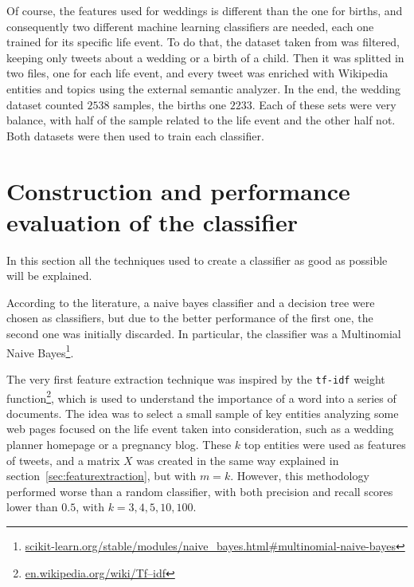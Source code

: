 Of course, the features used for weddings is different than the one for births, and consequently two different machine learning classifiers are needed, each one trained for its specific life event. To do that, the dataset taken from \cite{dickinson2015identifying} was filtered, keeping only tweets about a wedding or a birth of a child. Then it was splitted in two files, one for each life event, and every tweet was enriched with Wikipedia entities and topics using the external semantic analyzer. In the end, the wedding dataset counted $2538$ samples, the births one $2233$. Each of these sets were very balance, with half of the sample related to the life event and the other half not. Both datasets were then used to train each classifier.

\section{Construction and performance evaluation of the classifier}
In this section all the techniques used to create a classifier as good as possible will be explained.

 According to the literature, a naive bayes classifier and a decision tree were chosen as classifiers, but due to the better performance of the first one, the second one was initially discarded. In particular, the classifier was a Multinomial Naive Bayes\footnote{\url{scikit-learn.org/stable/modules/naive_bayes.html#multinomial-naive-bayes}}.

The very first feature extraction technique was inspired by the \texttt{tf-idf} weight function\footnote{\url{en.wikipedia.org/wiki/Tf–idf}}, which is used to understand the importance of a word into a series of documents. The idea was to select a small sample of key entities analyzing some web pages focused on the life event taken into consideration, such as a wedding planner homepage or a pregnancy blog. These $k$ top entities were used as features of tweets, and a matrix $X$ was created in the same way explained in section~\ref{sec:featurextraction}, but with $m = k$. However, this methodology performed worse than a random classifier, with both precision and recall scores lower than $0.5$, with $k = 3, 4, 5, 10, 100$.

